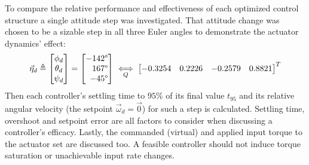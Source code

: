 \par
To compare the relative performance and effectiveness of each optimized control structure a single attitude step was investigated. That attitude change was chosen to be a sizable step in all three Euler angles to demonstrate the actuator dynamics' effect:
\begin{equation}\label{eq:attitude-step-position}
\vec{\eta}_d\triangleq\begin{bmatrix}
\phi_d\\
\theta_d\\
\psi_d\\
\end{bmatrix}
=
\begin{bmatrix*}[r]
-142\text{\textdegree}\\
167\text{\textdegree}\\
-45\text{\textdegree}
\end{bmatrix*}
\underset{Q}{\iff}
\begin{bmatrix}
-0.3254&
0.2226&
-0.2579&
0.8821
\end{bmatrix}^T
\end{equation}
Then each controller's settling time to $95$\% of its final value $t_{95}$ and its relative angular velocity (the setpoint $\vec{\omega}_d=\vec{0}$) for such a step is calculated. Settling time, overshoot and setpoint error are all factors to consider when discussing a controller's efficacy. Lastly, the commanded (virtual) and applied input torque to the actuator set are discussed too. A feasible controller should not induce torque saturation or unachievable input rate changes.
